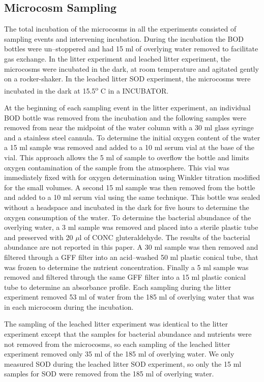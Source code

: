 \subsection{Microcosm Sampling}
The total incubation of the microcosms in all the experiments consisted of sampling events and intervening incubation. During the incubation the BOD bottles were un--stoppered and had 15 ml of overlying water removed to facilitate gas exchange. In the litter experiment and leached litter experiment, the microcosms were incubated in the dark, at room temperature and agitated gently on a rocker-shaker. In the leached litter SOD experiment, the microcosms were incubated in the dark at 15.5\textsuperscript{o} C in a INCUBATOR.

At the beginning of each sampling event in the litter experiment, an individual BOD bottle was removed from the incubation and the following samples were removed from near the midpoint of the water column with a 30 ml glass syringe and a stainless steel cannula. To determine the initial oxygen content of the water a 15 ml sample was removed and added to a 10 ml serum vial at the base of the vial. This approach allows the 5 ml of sample to overflow the bottle and limits oxygen contamination of the sample from the atmosphere. This vial was immediately fixed with for oxygen determination using Winkler titration \cite{CARPENTER_1965} modified for the small volumes. A second 15 ml sample was then removed from the bottle and added to a 10 ml serum vial using the same technique. This bottle was sealed without a headspace and incubated in the dark for five hours to determine the oxygen consumption of the water. To determine the bacterial abundance of the overlying water, a 3 ml sample was removed and placed into a sterile plastic tube and preserved with 20 $\mu$l of CONC gluteraldehyde. The results of the bacterial abundance are not reported in this paper. A 30 ml sample was then removed and filtered through a GFF filter into an acid--washed 50 ml plastic conical tube, that was frozen to determine the nutrient concentration. Finally a 5 ml sample was removed and filtered through the same GFF filter into a 15 ml plastic conical tube to determine an absorbance profile. Each sampling during the litter experiment removed 53 ml of water from the 185 ml of overlying water that was in each microcosm during the incubation. 

The sampling of the leached litter experiment was identical to the litter experiment except that the samples for bacterial abundance and nutrients were not removed from the microcosms, so each sampling of the leached litter experiment removed only 35 ml of the 185 ml of overlying water. We only measured SOD during the leached litter SOD experiment, so only the 15 ml samples for SOD were removed from the 185 ml of overlying water.

